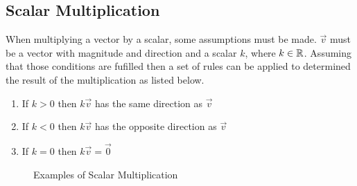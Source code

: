 \documentclass[12.5pt]{article}
\begin{document}
        \subsection{Scalar Multiplication}

        \begin{flushleft}
            
            When multiplying a vector by a scalar, some assumptions must be made. $\vec{v}$ must be a vector with 
            magnitude and direction and a scalar $k$, where $k\space\in\space\mathbb{R}$. 
            Assuming that those conditions are fufilled then a set of rules can be applied to determined the result
            of the multiplication as listed below. 

                \begin{enumerate}
                    \item If $k > 0$ then $k\vec{v}$ has the same direction as $\vec{v}$
                    \item If $k < 0$ then $k\vec{v}$ has the opposite direction as $\vec{v}$
                    \item If $k = 0$ then $k\vec{v} = \vec{0}$
                \end{enumerate}

            \begin{figure}[hb!]
                \begin{mdframed}
                    \centering
                    \caption{Examples of Scalar Multiplication}
                \end{mdframed}
            \end{figure}
            
        \end{flushleft}
\end{document}
